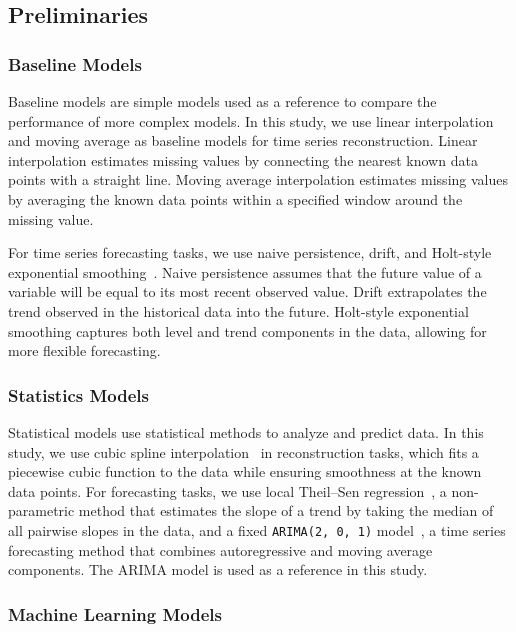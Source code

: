 \subsection{Preliminaries}

\subsubsection{Baseline Models}

Baseline models are simple models used as a reference to compare the performance of more complex models. In this study, we use linear interpolation and moving average as baseline models for time series reconstruction. Linear interpolation estimates missing values by connecting the nearest known data points with a straight line. Moving average interpolation estimates missing values by averaging the known data points within a specified window around the missing value.

For time series forecasting tasks, we use naive persistence, drift, and Holt-style exponential smoothing~\cite{holt2004forecasting}. Naive persistence assumes that the future value of a variable will be equal to its most recent observed value. Drift extrapolates the trend observed in the historical data into the future. Holt-style exponential smoothing captures both level and trend components in the data, allowing for more flexible forecasting.

\subsubsection{Statistics Models}

Statistical models use statistical methods to analyze and predict data. In this study, we use cubic spline interpolation~\cite{de1978practical} in reconstruction tasks, which fits a piecewise cubic function to the data while ensuring smoothness at the known data points. For forecasting tasks, we use local Theil--Sen regression~\cite{sen1968estimates}, a non-parametric method that estimates the slope of a trend by taking the median of all pairwise slopes in the data, and a fixed \texttt{ARIMA(2, 0, 1)} model~\cite{box2015time}, a time series forecasting method that combines autoregressive and moving average components. The ARIMA model is used as a reference in this study.

\subsubsection{Machine Learning Models}

